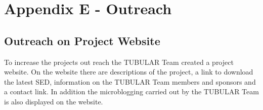 \section{Appendix E - Outreach} \label{sec:appE}

\subsection{Outreach on Project Website}

To increase the projects out reach the TUBULAR Team created a project website. On the website there are descriptions of the project, a link to download the latest SED, information on the TUBULAR Team members and sponsors and a contact link. In addition the microblogging carried out by the TUBULAR Team is also displayed on the website.

